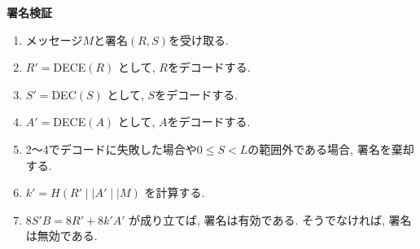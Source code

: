 \vspace{2em}
\let\ltxlist\list
\begin{breakitembox}[l]{\textbf{署名検証}}
　
  \begin{enumerate}[parsep=7pt]
    \item メッセージ$M$と署名$(R,S)$を受け取る.
    \item $R'=$DECE$(R)$ として, $R$をデコードする.
    \item $S'=$DEC$(S)$ として, $S$をデコードする.
    \item $A'=$DECE$(A)$ として, $A$をデコードする.
    \item 2～4でデコードに失敗した場合や$0\leq S<L$の範囲外である場合, 
    署名を棄却する.
    \item $k'=H(R' \mid\mid A' \mid\mid M)$ を計算する.
    \item $8S'B=8R'+8k'A'$ が成り立てば, 署名は有効である.
    そうでなければ, 署名は無効である.
  \end{enumerate}
\end{breakitembox}
% 　
